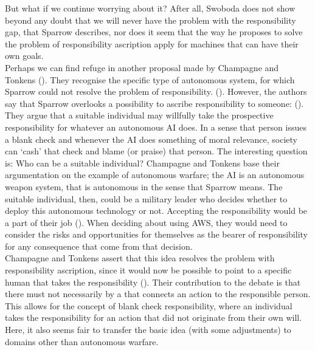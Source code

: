 \documentclass{article}
\newcounter{example}
\begin{document}
But what if we continue worrying about it? After all, Swoboda does not show
beyond any doubt that we will never have the problem with the responsibility
gap, that Sparrow describes, nor does it seem that the way he proposes to solve
the problem of responsibility ascription apply for machines that can have their
own goals.\\

Perhaps we can find refuge in another proposal made by Champagne and Tonkens
(\cite{champagne2015bridging}). They recognise the specific type of autonomous system,
for which Sparrow could not resolve the problem of responsibility.  (\cite[p.
128]{champagne2015bridging}). However, the authors say that Sparrow overlooks a
possibility to ascribe responsibility to someone:  
(\cite[p. 132]{champagne2015bridging}). They argue that a suitable individual
may willfully take the prospective responsibility for whatever an autonomous AI
does. In a sense that person issues a blank check and whenever the AI does
something of moral relevance, society can `cash' that check and blame (or praise)
that person. The interesting question is: Who can be a suitable individual?
Champagne and Tonkens base their argumentation on the example of autonomous
warfare; the AI is an autonomous weapon system, that is autonomous in the sense
that Sparrow means. The suitable individual, then, could be a military leader who
decides whether to deploy this autonomous technology or not. Accepting the
responsibility would be a  part of their job (\cite[p.
132]{champagne2015bridging}). When deciding about using AWS, they would need to
consider the risks and opportunities for themselves as the bearer of
responsibility for any consequence that come from that decision.\\
Champagne and Tonkens assert that this idea resolves the problem with
responsibility ascription, since it would now be possible to point to a specific
human that takes the responsibility (\cite[p. 132]{champagne2015bridging}).
Their contribution to the debate is that there must not necessarily by a
 that connects an action to the responsible person. This
allows for the concept of blank check responsibility, where an individual takes
the responsibility for an action that did not originate from their own will.
Here, it also seems fair to transfer the basic idea (with some adjustments) to
domains other than autonomous warfare.\\
\end{document}
